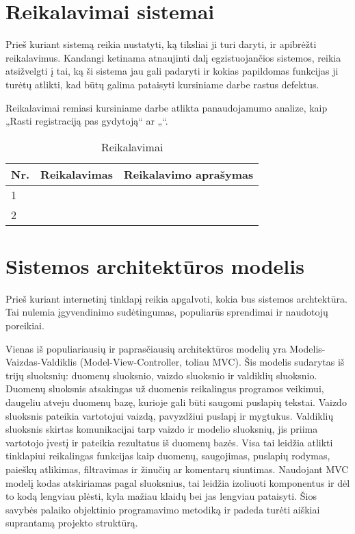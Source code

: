 \documentclass{VUMIFPSkursinis}
\begin{document}
\section{Reikalavimai sistemai}
Prieš kuriant sistemą reikia nustatyti, ką tiksliai ji turi daryti, ir apibrėžti reikalavimus. Kandangi ketinama atnaujinti dalį egzistuojančios sistemos, reikia atsižvelgti į tai, ką ši sistema jau gali padaryti ir kokias papildomas funkcijas ji turėtų atlikti, kad būtų galima pataisyti kursiniame darbe rastus defektus\cite{Kursinis}.


Reikalavimai remiasi kursiniame darbe atlikta panaudojamumo analize, kaip „Rasti registraciją pas gydytoją“ ar „“.

\begin{table}[H]\footnotesize
  \centering
  \caption{Reikalavimai}
  {\begin{tabular}{|l|c|c|} \hline
    Nr. & Reikalavimas & Reikalavimo aprašymas\\
    \hline
    1  &     &        \\
    2  &     &        \\
    \hline
  \end{tabular}}
  \label{Reikalavimai}
\end{table}


\section{Sistemos architektūros modelis}
Prieš kuriant internetinį tinklapį reikia apgalvoti, kokia bus sistemos archtektūra. Tai nulemia įgyvendinimo sudėtingumas, populiarūs sprendimai ir naudotojų poreikiai.

Vienas iš populiariausių ir paprasčiausių architektūros modelių yra Modelis-Vaizdas-Valdiklis (Model-View-Controller, toliau MVC)\cite{MVCDefinition}. Šis modelis sudarytas iš trijų sluoksnių: duomenų sluoksnio, vaizdo sluoksnio ir valdiklių sluoksnio. Duomenų sluoksnis atsakingas už duomenis reikalingus programos veikimui, daugeliu atveju duomenų bazę, kurioje gali būti saugomi puslapių tekstai\cite{MVCSO3}. Vaizdo sluoksnis pateikia vartotojui vaizdą, pavyzdžiui puslapį ir mygtukus. Valdiklių sluoksnis skirtas komunikacijai tarp vaizdo ir modelio sluoksnių, jis priima vartotojo įvestį ir pateikia rezultatus iš duomenų bazės. Visa tai leidžia atlikti tinklapiui reikalingas funkcijas kaip duomenų, saugojimas, puslapių rodymas, paieškų atlikimas, filtravimas ir žinučių ar komentarų siuntimas. Naudojant MVC modelį kodas atskiriamas pagal sluoksnius, tai leidžia izoliuoti komponentus ir dėl to kodą lengviau plėsti, kyla mažiau klaidų bei jas lengviau pataisyti. Šios savybės palaiko objektinio programavimo metodiką ir padeda turėti aiškiai suprantamą projekto struktūrą.
\end{document}
